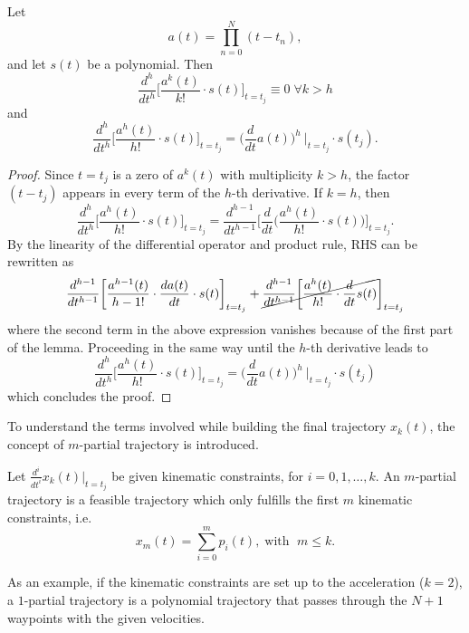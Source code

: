 \begin{lemma}
\label{lemma:rst_Lemma2}
Let
\begin{equation*}
a(t) = \prod_{n=0}^{N}{(t-t_n)},
\end{equation*}
and let $s(t)$ be a polynomial. Then
\begin{equation}
\frac{d^h}{dt^h}\biggl[\frac{a^k(t)}{k!}\cdot s(t)\biggr]_{t=t_j} \equiv 0 \; \forall k>h
\label{eq:rst_diff_ak}
\end{equation}
and
\begin{equation}
\frac{d^h}{dt^h}\biggl[\frac{a^h(t)}{h!}\cdot s(t)\biggr]_{t=t_j} = \biggl(\frac{d}{dt}a(t)\biggr)^h\ \biggr|_{t=t_j} \cdot s(t_j).
\label{eq:rst_diff_ah}
\end{equation}
\end{lemma}
\begin{proof}
Since $t=t_j$ is a zero of $a^k(t)$ with multiplicity $k>h$, the factor $(t-t_j)$ appears in every term of the $h$-th derivative. If $k=h$, then
\begin{equation}
\frac{d^h}{dt^h}\biggl[\frac{a^h(t)}{h!}\cdot s(t)\biggr]_{t=t_j} = \frac{d^{h-1}}{dt^{h-1}}\biggl[\frac{d}{dt} \biggl(\frac{a^h(t)}{h!}\cdot s(t)\biggr)\biggr]_{t=t_j}.
\end{equation}
By the linearity of the differential operator and product rule, RHS can be rewritten as
\begin{equation}
\frac{d^{h-1}}{dt^{h-1}}\biggl[\frac{a^{h-1}(t)}{{h-1}!}\cdot \frac{d a(t)}{dt}\cdot s(t)\biggr]_{t=t_j} + \cancel{\frac{d^{h-1}}{dt^{h-1}}\biggl[\frac{a^h(t)}{h!}\cdot \frac{d}{dt}s(t)}\biggr]_{t=t_j}
\end{equation}
where the second term in the above expression vanishes because of the first part of the lemma. Proceeding in the same way until the $h$-th derivative leads to
\begin{equation}
\frac{d^h}{dt^h}\biggl[\frac{a^h(t)}{h!}\cdot s(t)\biggr]_{t=t_j} = \biggl(\frac{d}{dt}a(t)\biggr)^h\ \biggr|_{t=t_j} \cdot s(t_j)
\end{equation}
which concludes the proof. \qedhere  
\end{proof}

To understand the terms involved while building the final trajectory $x_k(t)$, the concept of $m$-partial trajectory is introduced.
\begin{defn}
\label{def:rst_def1}
Let $\frac{d^i}{dt^i}x_k(t)\bigr|_{t=t_j}$ be given kinematic constraints, for $i=0,1,\dots, k$. An $m$-partial trajectory is a feasible trajectory which only fulfills the first $m$ kinematic constraints, i.e. 
\begin{equation}
x_m(t) = \sum_{i=0}^{m}{p_i(t)}, \; \text{with }\; m\leq k.
\end{equation} 
\end{defn}
As an example, if the kinematic constraints are set up to the acceleration ($k=2$), a $1$-partial trajectory is a polynomial trajectory that passes through the $N+1$ waypoints with the given velocities.

